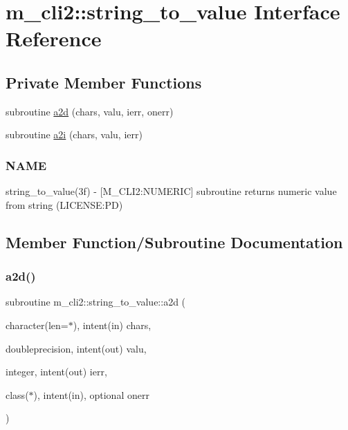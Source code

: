 \hypertarget{interfacem__cli2_1_1string__to__value}{}\section{m\+\_\+cli2\+:\+:string\+\_\+to\+\_\+value Interface Reference}
\label{interfacem__cli2_1_1string__to__value}
\subsection*{Private Member Functions}
\begin{DoxyCompactItemize}
\item 
subroutine \mbox{\hyperlink{interfacem__cli2_1_1string__to__value_ad579c3183bd46ec64ac2f6517b71da0e}{a2d}} (chars, valu, ierr, onerr)
\item 
subroutine \mbox{\hyperlink{interfacem__cli2_1_1string__to__value_af221de32e1c7dd6915ea45dc3a0147ed}{a2i}} (chars, valu, ierr)
\begin{DoxyCompactList}\small\item\em \subsubsection*{N\+A\+ME}

string\+\_\+to\+\_\+value(3f) -\/ \mbox{[}M\+\_\+\+C\+L\+I2\+:N\+U\+M\+E\+R\+IC\mbox{]} subroutine returns numeric value from string (L\+I\+C\+E\+N\+SE\+:PD) \end{DoxyCompactList}\end{DoxyCompactItemize}


\subsection{Member Function/\+Subroutine Documentation}
\mbox{\label{interfacem__cli2_1_1string__to__value_ad579c3183bd46ec64ac2f6517b71da0e}} 
\subsubsection{\texorpdfstring{a2d()}{a2d()}}
{\footnotesize\ttfamily subroutine m\+\_\+cli2\+::string\+\_\+to\+\_\+value\+::a2d (\begin{DoxyParamCaption}\item[{character(len=$\ast$), intent(in)}]{chars,  }\item[{doubleprecision, intent(out)}]{valu,  }\item[{integer, intent(out)}]{ierr,  }\item[{class($\ast$), intent(in), optional}]{onerr }\end{DoxyParamCaption})\hspace{0.3cm}{\ttfamily [private]}}

